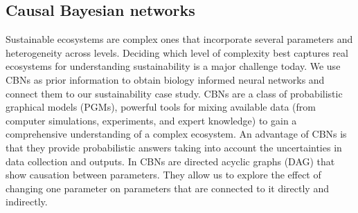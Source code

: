 \documentclass[12pt,a4paper]{article}
\newcommand{\Zu}[1]{\textcolor{blue}{\rm{Zu cmmt:} #1 \rm}}
\begin{document}



\subsection{Causal Bayesian networks}
Sustainable ecosystems are complex ones that incorporate several parameters and heterogeneity across levels. Deciding which level of complexity best captures real ecosystems for understanding sustainability is a major challenge today. We use CBNs as prior information to obtain biology informed neural networks and connect them to our sustainability case study. CBNs are a class of probabilistic graphical models (PGMs), powerful tools for mixing available data (from computer simulations, experiments, and expert knowledge) to gain a comprehensive understanding of a complex ecosystem. An advantage of CBNs is that they provide probabilistic answers taking into account the uncertainties in data collection and outputs. In CBNs are directed acyclic graphs (DAG) that show causation between parameters. They allow us to explore the effect of changing one parameter on parameters that are connected to it directly and indirectly. 
\end{document}
